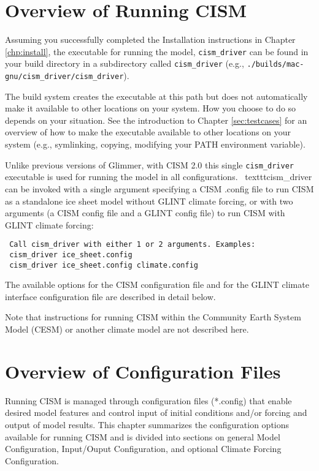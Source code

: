 \section{Overview of Running CISM}

Assuming you successfully completed the Installation instructions in Chapter \ref{chp:install},
the executable for running the model, \texttt{cism\_driver} can be found in your 
build directory in a subdirectory called \texttt{cism\_driver} 
(e.g., \texttt{./builds/mac-gnu/cism\_driver/cism\_driver}).

The build system creates the executable at this path but does not automatically
make it available to other locations on your system.  How you choose to do so depends 
on your situation.  See the introduction to Chapter \ref{sec:testcases} for 
an overview of how to make the executable available to other locations on your system
(e.g., symlinking, copying, modifying your PATH environment variable).

Unlike previous versions of Glimmer, with CISM 2.0 this single \texttt{cism\_driver} 
executable is used for running the model in all configurations.  \
texttt{cism\_driver} can be invoked with a single argument specifying 
a CISM .config file to run CISM  as a standalone ice sheet model without GLINT climate forcing,
 or with two arguments (a CISM config file and a GLINT config file) 
to run CISM with GLINT climate forcing:
\begin{verbatim}
 Call cism_driver with either 1 or 2 arguments. Examples:
 cism_driver ice_sheet.config
 cism_driver ice_sheet.config climate.config
\end{verbatim}
The available options for the CISM configuration file and 
for the GLINT climate interface configuration file are described in detail below.

Note that instructions for running CISM within the Community Earth System Model (CESM)
or another climate model are not described here.



\section{Overview of Configuration Files}

Running CISM is managed through configuration files (*.config) that enable 
desired model features and control input of initial conditions and/or forcing 
and output of model results.  This chapter summarizes the configuration options 
available for running CISM and is divided into sections on general Model Configuration, 
Input/Ouput Configuration, and optional Climate Forcing Configuration.

